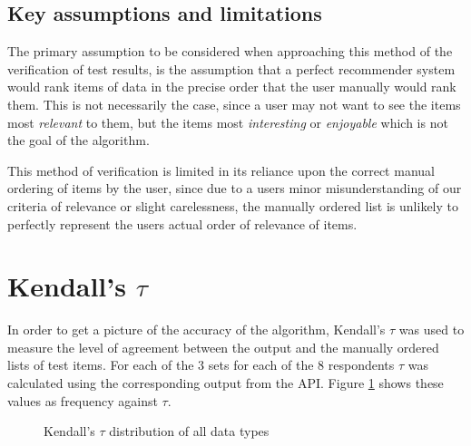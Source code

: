\subsection{Key assumptions and limitations}

The primary assumption to be considered when approaching this method of the verification of test results, is the assumption that a perfect recommender system would rank items of data in the precise order that the user manually would rank them. This is not necessarily the case, since a user may not want to see the items most \textit{relevant} to them, but the items most \textit{interesting} or \textit{enjoyable} which is not the goal of the algorithm. 

This method of verification is limited in its reliance upon the correct manual ordering of items by the user, since due to a users minor misunderstanding of our criteria of relevance or slight carelessness, the manually ordered list is unlikely to perfectly represent the users actual order of relevance of items. 

\section{Kendall's $\tau$}

In order to get a picture of the accuracy of the algorithm, Kendall's $\tau$ was used to measure the level of agreement between the output and the manually ordered lists of test items. For each of the 3 sets for each of the 8 respondents $\tau$ was calculated using the corresponding output from the API. Figure \ref{kendallsTauGraph} shows these values as frequency against $\tau$. 

\begin{figure}[ht!]
    \caption{Kendall's $\tau$ distribution of all data types}
    \label{kendallsTauGraph}
\end{figure}

